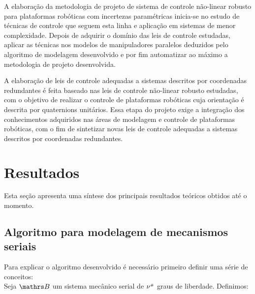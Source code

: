 \documentclass[a4paper,11pt,brazil,fleqn]{article}
\begin{document}
A elabora\c{c}\~ao da metodologia de projeto de sistema de controle n\~ao-linear robusto para plataformas rob\'oticas com incertezas param\'etricas inicia-se no estudo de t\'ecnicas de controle que seguem esta linha e aplica\c{c}\~ao em sistemas de menor complexidade. Depois de adquirir o dom\'inio das leis de controle estudadas, aplicar as t\'ecnicas nos modelos de manipuladores paralelos deduzidos pelo algoritmo de modelagem desenvolvido e por fim automatizar ao m\'aximo a metodologia de projeto desenvolvida.

A elabora\c{c}\~ao de leis de controle adequadas a sistemas descritos por coordenadas redundantes \'e feita baseado nas leis de controle n\~ao-linear robusto estudadas, com o objetivo de realizar o controle de plataformas rob\'oticas cuja orienta\c{c}\~ao \'e descrita por quaternions unit\'arios. Essa etapa do projeto exige a integra\c{c}\~ao dos conhecimentos adquiridos nas \'areas de modelagem e controle de plataformas rob\'oticas, com o fim de sintetizar novas leis de controle adequadas a sistemas descritos por coordenadas redundantes.


\section{Resultados}\label{S04}

Esta se\c{c}\~ao apresenta uma s\'intese dos principais resultados te\'oricos obtidos at\'e o momento.

\subsection{Algoritmo para modelagem de mecanismos seriais}\label{S04-1}

Para explicar o algoritmo desenvolvido \'e necess\'ario primeiro definir uma s\'erie de conceitos: \\

Seja $\ssB$ um sistema mec\^anico serial de $\nu^{\scriptscriptstyle \#}$ graus de liberdade. Definimos:
\end{document}
